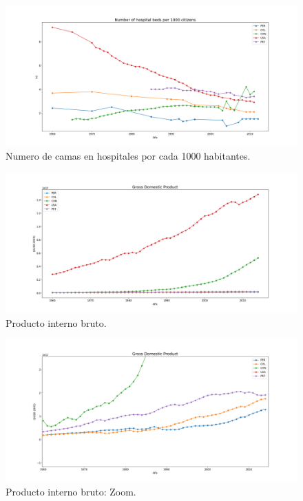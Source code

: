 \documentclass{article}
\begin{document}
\begin{figure}
	\centering
	\includegraphics[scale=0.38]{images/figure_1-3.png}
	\caption{Numero de camas en hospitales por cada 1000 habitantes.}
	\label{fig:5}
\end{figure}

\begin{figure}
	\centering
	\includegraphics[scale=0.38]{images/figure_1-4.png}
	\caption{Producto interno bruto.}
	\label{fig:6}
\end{figure}

\begin{figure}
	\centering
	\includegraphics[scale=0.38]{images/a.png}
	\caption{Producto interno bruto: Zoom.}
	\label{fig:7}
\end{figure}
\end{document}
